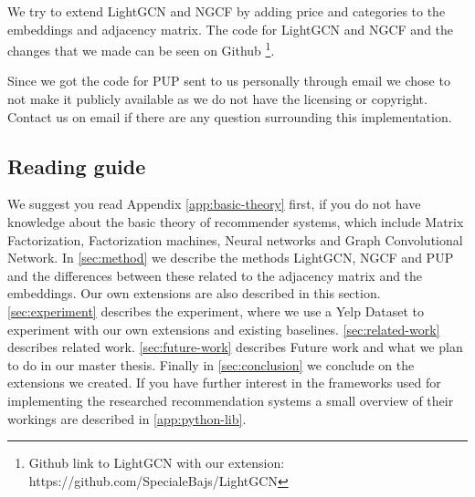 We try to extend LightGCN and NGCF by adding price and categories to the embeddings and adjacency matrix.
The code for LightGCN and NGCF and the changes that we made can be seen on Github \footnote{Github link to LightGCN with our extension: https://github.com/SpecialeBajs/LightGCN}.

Since we got the code for PUP sent to us personally through email we chose to not make it publicly available as we do not have the licensing or copyright.
Contact us on email if there are any question surrounding this implementation.

\subsection{Reading guide}
We suggest you read Appendix \ref{app:basic-theory} first, if you do not have knowledge about the basic theory of recommender systems, which include Matrix Factorization, Factorization machines, Neural networks and Graph Convolutional Network.
In \autoref{sec:method} we describe the methods LightGCN, NGCF and PUP and the differences between these related to the adjacency matrix and the embeddings.
Our own extensions are also described in this section.
\autoref{sec:experiment} describes the experiment, where we use a Yelp Dataset to experiment with our own extensions and existing baselines.
\autoref{sec:related-work} describes related work.
\autoref{sec:future-work} describes Future work and what we plan to do in our master thesis.
Finally in \autoref{sec:conclusion} we conclude on the extensions we created.
If you have further interest in the frameworks used for implementing the researched recommendation systems a small overview of their workings are described in \autoref{app:python-lib}.